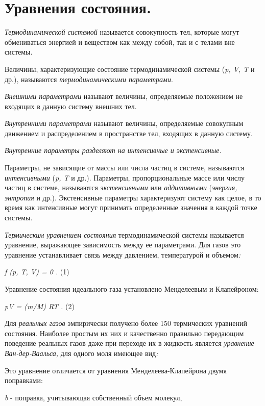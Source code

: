 \chapter{Уравнения состояния.} \label{equationOfState}

\emph{Термодинамической системой} называется совокупность тел, которые
могут обмениваться энергией и веществом как между собой, так и с телами
вне системы.

Величины, характеризующие состояние термодинамической системы (\emph{p,
V, T} и др.), называются \emph{термодинамическими параметрами}.

\emph{Внешними параметрами} называют величины, определяемые положением
не входящих в данную систему внешних тел.

\emph{Внутренними параметрами} называют величины, определяемые
совокупным движением и распределением в пространстве тел, входящих в
данную систему.

\emph{Внутренние параметры разделяют на интенсивные и экстенсивные.}

Параметры, не зависящие от массы или числа частиц в системе, называются
\emph{интенсивными} (\emph{p, T} и др.). Параметры, пропорциональные
массе или числу частиц в системе, называются \emph{экстенсивными} или
\emph{аддитивными} (\emph{энергия, энтропия} и др.). Экстенсивные
параметры характеризуют систему как целое, в то время как интенсивные
могут принимать определенные значения в каждой точке системы.

\emph{Термическим уравнением состояния} термодинамической системы
называется уравнение, выражающее зависимость между ее параметрами. Для
газов это уравнение устанавливает связь между давлением, температурой и
объемом\emph{:}

\emph{f (p, T, V) = 0 .} (1)

Уравнение состояния идеального газа установлено Менделеевым и
Клапейроном:

\emph{pV = (m/M) RT .} (2)

Для \emph{реальных газов} эмпирически получено более 150 термических
уравнений состояния. Наиболее простым их них и качественно правильно
передающим поведение реальных газов даже при переходе их в жидкость
является \emph{уравнение Ван-дер-Ваальса,} для одного моля имеющее
вид\emph{:}


Это уравнение отличается от уравнения Менделеева-Клапейрона двумя
поправками:

\emph{b} - поправка, учитывающая собственный объем молекул,

